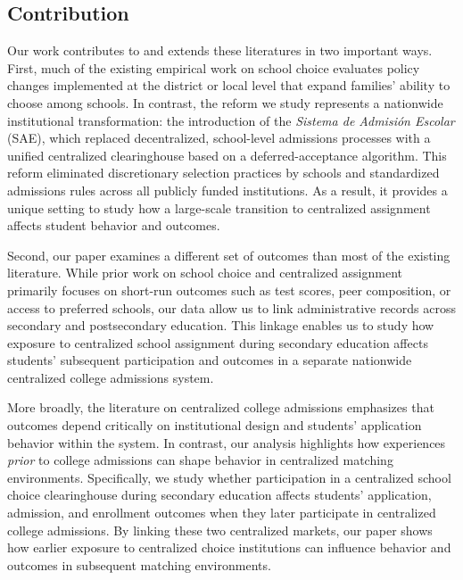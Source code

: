 \documentclass[11pt]{article}
\begin{document}
\subsection{Contribution}
Our work contributes to and extends these literatures in two important ways. First, much of the existing empirical work on school choice evaluates policy changes implemented at the district or local level that expand families' ability to choose among schools. In contrast, the reform we study represents a nationwide institutional transformation: the introduction of the \emph{Sistema de Admisión Escolar} (SAE), which replaced decentralized, school-level admissions processes with a unified centralized clearinghouse based on a deferred-acceptance algorithm. This reform eliminated discretionary selection practices by schools and standardized admissions rules across all publicly funded institutions. As a result, it provides a unique setting to study how a large-scale transition to centralized assignment affects student behavior and outcomes.

Second, our paper examines a different set of outcomes than most of the existing literature. While prior work on school choice and centralized assignment primarily focuses on short-run outcomes such as test scores, peer composition, or access to preferred schools, our data allow us to link administrative records across secondary and postsecondary education. This linkage enables us to study how exposure to centralized school assignment during secondary education affects students’ subsequent participation and outcomes in a separate nationwide centralized college admissions system.

More broadly, the literature on centralized college admissions emphasizes that outcomes depend critically on institutional design and students’ application behavior within the system. In contrast, our analysis highlights how experiences \emph{prior} to college admissions can shape behavior in centralized matching environments. Specifically, we study whether participation in a centralized school choice clearinghouse during secondary education affects students’ application, admission, and enrollment outcomes when they later participate in centralized college admissions. By linking these two centralized markets, our paper shows how earlier exposure to centralized choice institutions can influence behavior and outcomes in subsequent matching environments.

\end{document}
